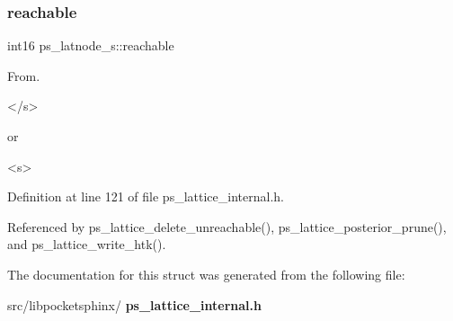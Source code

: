 \subsubsection{reachable}
{\footnotesize\ttfamily int16 ps\+\_\+latnode\+\_\+s\+::reachable}



From. 

\begin{DoxyVerb}</s> \end{DoxyVerb}
 or\begin{DoxyVerb}<s> \end{DoxyVerb}
 

Definition at line 121 of file ps\+\_\+lattice\+\_\+internal.\+h.



Referenced by ps\+\_\+lattice\+\_\+delete\+\_\+unreachable(), ps\+\_\+lattice\+\_\+posterior\+\_\+prune(), and ps\+\_\+lattice\+\_\+write\+\_\+htk().



The documentation for this struct was generated from the following file\+:\begin{DoxyCompactItemize}
\item 
src/libpocketsphinx/\textbf{ ps\+\_\+lattice\+\_\+internal.\+h}\end{DoxyCompactItemize}
